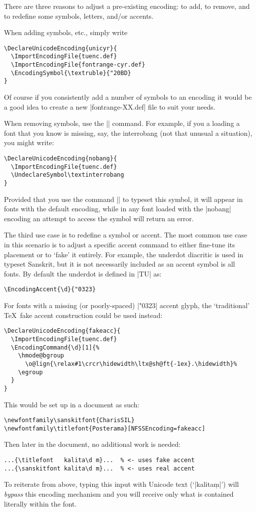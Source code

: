 \documentclass[a4paper]{ltxdoc}
\begin{document}
There are three reasons to adjust a pre-existing encoding:
to add, to remove, and to redefine some symbols, letters, and/or accents.

When adding symbols, etc., simply write
\begin{Verbatim}
\DeclareUnicodeEncoding{unicyr}{
  \ImportEncodingFile{tuenc.def}
  \ImportEncodingFile{fontrange-cyr.def}
  \EncodingSymbol{\textruble}{"20BD}
}
\end{Verbatim}
Of course if you consistently add a number of symbols to an encoding it would be
a good idea to create a new |fontrange-XX.def| file to suit your needs.

When removing symbols, use the |\UndeclareSymbol| command.
For example, if you a loading a font that you know is missing, say, the interrobang
(not that unusual a situation), you might write:
\begin{Verbatim}
\DeclareUnicodeEncoding{nobang}{
  \ImportEncodingFile{tuenc.def}
  \UndeclareSymbol\textinterrobang
}
\end{Verbatim}
Provided that you use the command |\textinterrobang| to typeset this symbol,
it will appear in fonts with the default encoding, while in any font loaded with
the |nobang| encoding an attempt to access the symbol will return an error.


The third use case is to redefine a symbol or accent. The most common use case
in this scenario is to adjust a specific accent command to either fine-tune its placement
or to `fake' it entirely.
For example, the underdot diacritic is used in typeset Sanskrit,
but it is not necessarily included as an accent symbol is all fonts.
By default the underdot is defined in |TU| as:
\begin{Verbatim}
\EncodingAccent{\d}{"0323}
\end{Verbatim}
For fonts with a missing (or poorly-spaced) |"0323| accent glyph, the `traditional' \TeX\ fake accent
construction could be used instead:
\begin{Verbatim}
\DeclareUnicodeEncoding{fakeacc}{
  \ImportEncodingFile{tuenc.def}
  \EncodingCommand{\d}[1]{%
    \hmode@bgroup
      \o@lign{\relax#1\crcr\hidewidth\ltx@sh@ft{-1ex}.\hidewidth}%
    \egroup
  }
}
\end{Verbatim}
This would be set up in a document as such:
\begin{Verbatim}
\newfontfamily\sanskitfont{CharisSIL}
\newfontfamily\titlefont{Posterama}[NFSSEncoding=fakeacc]
\end{Verbatim}
Then later in the document, no additional work is needed:
\begin{Verbatim}
...{\titlefont   kalita\d m}...  % <- uses fake accent
...{\sanskitfont kalita\d m}...  % <- uses real accent
\end{Verbatim}
To reiterate from above, typing this input with Unicode text (`|kalitaṃ|')
will \emph{bypass} this encoding mechanism and you will receive only what is contained
literally within the font.
\end{document}
